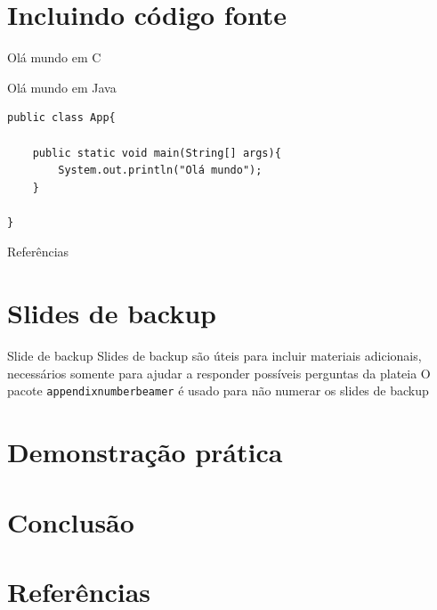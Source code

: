 \documentclass[aspectratio=169]{beamer}
\begin{document}
\section{Incluindo código fonte}


\begin{frame}[fragile]{Olá mundo em C}
    
\end{frame}

\begin{frame}[fragile]{Olá mundo em Java}
\begin{lstlisting}[style=java]
public class App{

    public static void main(String[] args){
        System.out.println("Olá mundo");
    }

}
\end{lstlisting}
\end{frame}

\begin{frame}[allowframebreaks]{Referências}
    \nocite{*}
    \printbibliography
\end{frame}
    
%     
%     

\appendix

\section{Slides de backup}

\begin{frame}{Slide de backup}
    Slides de backup são úteis para incluir materiais adicionais, necessários somente para ajudar a responder possíveis perguntas da plateia
    \vfill
    O pacote \texttt{appendixnumberbeamer} é usado para não numerar os slides de backup
\end{frame}

\section{Demonstração prática}

\section{Conclusão}

\section{Referências}
\end{document}
